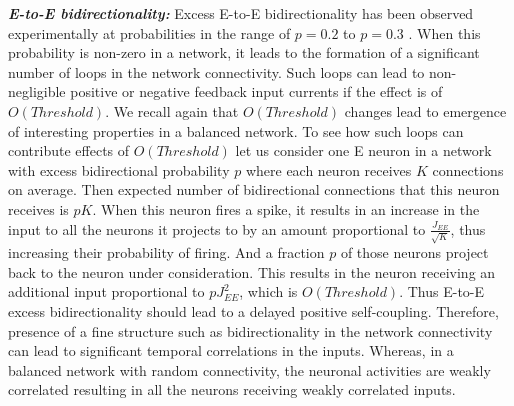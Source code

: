 \emph{\textbf{E-to-E bidirectionality:}} Excess E-to-E bidirectionality has been observed experimentally at probabilities in the range of $p = 0.2$ to $p = 0.3$ \cite{Song2005}. When this probability is non-zero in a network, it leads to the formation of a significant number of loops in the network connectivity. Such loops can lead to non-negligible positive or negative feedback input currents if the effect is of $O(Threshold)$. We recall again that $O(Threshold)$ changes lead to emergence of interesting properties in a balanced network. To see how such loops can contribute effects of $O(Threshold)$ let us consider one E neuron in a network with excess bidirectional probability $p$ where each neuron receives $K$ connections on average. Then expected number of bidirectional connections that this neuron receives is $pK$. When this neuron fires a spike, it results in an increase in the input to all the neurons it projects to by an amount proportional to $\frac{J_{EE}}{\sqrt{K}}$, thus increasing their probability of firing. And a fraction $p$ of those neurons project back to the neuron under consideration. This results in the neuron receiving an additional input proportional to $p J_{EE}^{2}$, which is $O(Threshold)$. Thus E-to-E excess bidirectionality should lead to a delayed positive self-coupling. Therefore, presence of a fine structure such as bidirectionality in the network connectivity can lead to significant temporal correlations in the inputs. Whereas, in a balanced network with random connectivity, the neuronal activities are weakly correlated resulting in all the neurons receiving weakly correlated inputs.\\ %
